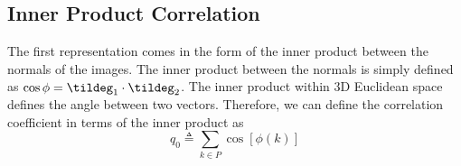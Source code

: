 \subsection{Inner Product Correlation}\label{subsec:inner-product-corr}
The first representation comes in the form of the inner product between the normals of the images. The inner product between the normals is simply defined as $\cos \phi = \tildeg_1 \cdot \tildeg_2$. The inner product within 3D Euclidean space defines the angle between two vectors. Therefore, we can define the correlation coefficient in terms of the inner product as
\begin{equation}\label{eq:inner-product-cosine}
    q_0 \triangleq \sum_{k \in P} \cos [\phi (k)]
\end{equation}

